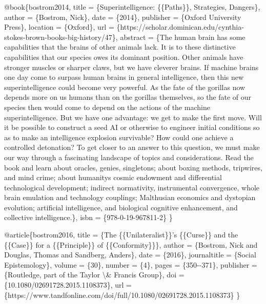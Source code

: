 \documentclass[
  11pt,
  letterpaper,
]{book}
\newenvironment{Shaded}{\begin{snugshade}}{\end{snugshade}}
\newcommand{\NormalTok}[1]{\textcolor[rgb]{0.00,0.23,0.31}{#1}}
\newcommand{\SpecialCharTok}[1]{\textcolor[rgb]{0.37,0.37,0.37}{#1}}
\begin{document}
\begin{Shaded}
\begin{Highlighting}[]
\NormalTok{@book\{bostrom2014,}
\NormalTok{  title = \{Superintelligence: \{\{Paths\}\}, Strategies, Dangers\},}
\NormalTok{  author = \{Bostrom, Nick\},}
\NormalTok{  date = \{2014\},}
\NormalTok{  publisher = \{Oxford University Press\},}
\NormalTok{  location = \{Oxford\},}
\NormalTok{  url = \{https://scholar.dominican.edu/cynthia{-}stokes{-}brown{-}books{-}big{-}history/47\},}
\NormalTok{  abstract = \{The human brain has some capabilities that the brains of other animals lack. It is to these distinctive capabilities that our species owes its dominant position. Other animals have stronger muscles or sharper claws, but we have cleverer brains. If machine brains one day come to surpass human brains in general intelligence, then this new superintelligence could become very powerful. As the fate of the gorillas now depends more on us humans than on the gorillas themselves, so the fate of our species then would come to depend on the actions of the machine superintelligence. But we have one advantage: we get to make the first move. Will it be possible to construct a seed AI or otherwise to engineer initial conditions so as to make an intelligence explosion survivable? How could one achieve a controlled detonation? To get closer to an answer to this question, we must make our way through a fascinating landscape of topics and considerations. Read the book and learn about oracles, genies, singletons; about boxing methods, tripwires, and mind crime; about humanity\textquotesingle{}s cosmic endowment and differential technological development; indirect normativity, instrumental convergence, whole brain emulation and technology couplings; Malthusian economics and dystopian evolution; artificial intelligence, and biological cognitive enhancement, and collective intelligence.\},}
\NormalTok{  isbn = \{978{-}0{-}19{-}967811{-}2\}}
\NormalTok{\}}

\NormalTok{@article\{bostrom2016,}
\NormalTok{  title = \{The \{\{Unilateralist\}\}’s \{\{Curse\}\} and the \{\{Case\}\} for a \{\{Principle\}\} of \{\{Conformity\}\}\},}
\NormalTok{  author = \{Bostrom, Nick and Douglas, Thomas and Sandberg, Anders\},}
\NormalTok{  date = \{2016\},}
\NormalTok{  journaltitle = \{Social Epistemology\},}
\NormalTok{  volume = \{30\},}
\NormalTok{  number = \{4\},}
\NormalTok{  pages = \{350{-}{-}371\},}
\NormalTok{  publisher = \{Routledge, part of the Taylor }\SpecialCharTok{\textbackslash{}\&}\NormalTok{ Francis Group\},}
\NormalTok{  doi = \{10.1080/02691728.2015.1108373\},}
\NormalTok{  url = \{https://www.tandfonline.com/doi/full/10.1080/02691728.2015.1108373\}}
\NormalTok{\}}


\end{Highlighting}
\end{Shaded}
\end{document}
